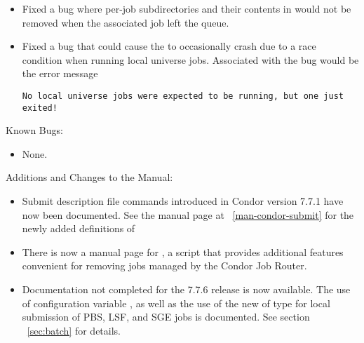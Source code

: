 \begin{itemize}
\item Fixed a bug where per-job subdirectories and their contents
in  would not be removed when the associated job
left the queue.

\item Fixed a bug that could cause the  to 
occasionally crash due to a race condition when running local universe jobs.
Associated with the bug would be the error message
\footnotesize
\begin{verbatim}
No local universe jobs were expected to be running, but one just exited!
\end{verbatim}
\normalsize
{}

\end{itemize}

\noindent Known Bugs:

\begin{itemize}

\item None.

\end{itemize}

\noindent Additions and Changes to the Manual:

\begin{itemize}

\item Submit description file commands introduced in Condor version 7.7.1
have now been documented.
See the  manual page at ~\ref{man-condor-submit} for
the newly added definitions of
\begin{description}
  \item[]
  \item[]
  \item[]
  \item[]
  \item[]
  \item[]
\end{description}

\item There is now a manual page for , 
a script that provides additional features convenient for removing
jobs managed by the Condor Job Router.

\item Documentation not completed for the 7.7.6 release is now available.
The use of configuration variable ,
as well as the use of the new  of
type  for local submission of PBS, LSF, and SGE
jobs is documented.
See section ~\ref{sec:batch} for details.

\end{itemize}


